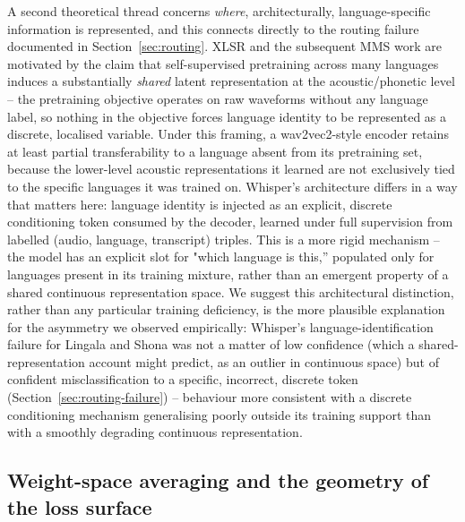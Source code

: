 \documentclass[11pt]{article}
\begin{document}
A second theoretical thread concerns \emph{where}, architecturally, language-specific information is represented, and this connects directly to the routing failure documented in Section~\ref{sec:routing}. XLSR \cite{conneau2021xlsr} and the subsequent MMS work \cite{pratap2024mms} are motivated by the claim that self-supervised pretraining across many languages induces a substantially \emph{shared} latent representation at the acoustic/phonetic level -- the pretraining objective operates on raw waveforms without any language label, so nothing in the objective forces language identity to be represented as a discrete, localised variable. Under this framing, a wav2vec2-style encoder retains at least partial transferability to a language absent from its pretraining set, because the lower-level acoustic representations it learned are not exclusively tied to the specific languages it was trained on. Whisper's architecture differs in a way that matters here: language identity is injected as an explicit, discrete conditioning token consumed by the decoder, learned under full supervision from labelled (audio, language, transcript) triples. This is a more rigid mechanism -- the model has an explicit slot for "which language is this,'' populated only for languages present in its training mixture, rather than an emergent property of a shared continuous representation space. We suggest this architectural distinction, rather than any particular training deficiency, is the more plausible explanation for the asymmetry we observed empirically: Whisper's language-identification failure for Lingala and Shona was not a matter of low confidence (which a shared-representation account might predict, as an outlier in continuous space) but of confident misclassification to a specific, incorrect, discrete token (Section~\ref{sec:routing-failure}) -- behaviour more consistent with a discrete conditioning mechanism generalising poorly outside its training support than with a smoothly degrading continuous representation.

\subsection{Weight-space averaging and the geometry of the loss surface}
\end{document}
